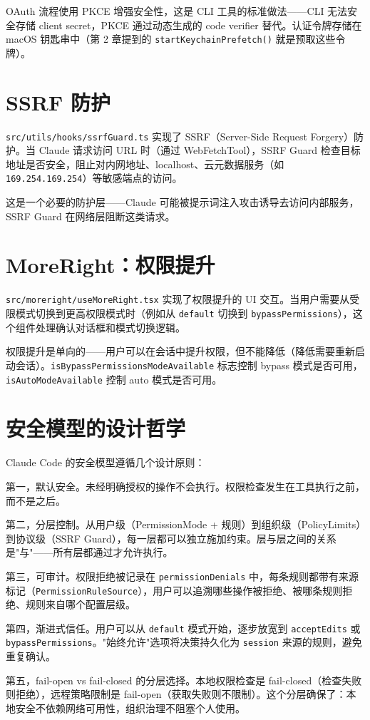 OAuth 流程使用 PKCE 增强安全性，这是 CLI 工具的标准做法——CLI 无法安全存储 client secret，PKCE 通过动态生成的 code verifier 替代。认证令牌存储在 macOS 钥匙串中（第 2 章提到的 \texttt{startKeychainPrefetch()} 就是预取这些令牌）。

\section{SSRF 防护}

\texttt{src/utils/hooks/ssrfGuard.ts} 实现了 SSRF（Server-Side Request Forgery）防护。当 Claude 请求访问 URL 时（通过 WebFetchTool），SSRF Guard 检查目标地址是否安全，阻止对内网地址、localhost、云元数据服务（如 \texttt{169.254.169.254}）等敏感端点的访问。

这是一个必要的防护层——Claude 可能被提示词注入攻击诱导去访问内部服务，SSRF Guard 在网络层阻断这类请求。

\section{MoreRight：权限提升}

\texttt{src/moreright/useMoreRight.tsx} 实现了权限提升的 UI 交互。当用户需要从受限模式切换到更高权限模式时（例如从 \texttt{default} 切换到 \texttt{bypassPermissions}），这个组件处理确认对话框和模式切换逻辑。

权限提升是单向的——用户可以在会话中提升权限，但不能降低（降低需要重新启动会话）。\texttt{isBypassPermissionsModeAvailable} 标志控制 bypass 模式是否可用，\texttt{isAutoModeAvailable} 控制 auto 模式是否可用。

\section{安全模型的设计哲学}

Claude Code 的安全模型遵循几个设计原则：

第一，默认安全。未经明确授权的操作不会执行。权限检查发生在工具执行之前，而不是之后。

第二，分层控制。从用户级（PermissionMode + 规则）到组织级（PolicyLimits）到协议级（SSRF Guard），每一层都可以独立施加约束。层与层之间的关系是"与"——所有层都通过才允许执行。

第三，可审计。权限拒绝被记录在 \texttt{permissionDenials} 中，每条规则都带有来源标记（\texttt{PermissionRuleSource}），用户可以追溯哪些操作被拒绝、被哪条规则拒绝、规则来自哪个配置层级。

第四，渐进式信任。用户可以从 \texttt{default} 模式开始，逐步放宽到 \texttt{acceptEdits} 或 \texttt{bypassPermissions}。"始终允许"选项将决策持久化为 \texttt{session} 来源的规则，避免重复确认。

第五，fail-open vs fail-closed 的分层选择。本地权限检查是 fail-closed（检查失败则拒绝），远程策略限制是 fail-open（获取失败则不限制）。这个分层确保了：本地安全不依赖网络可用性，组织治理不阻塞个人使用。
